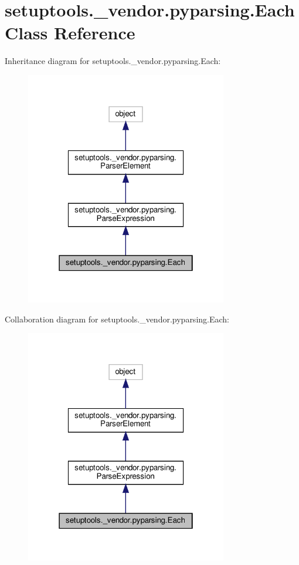 \hypertarget{classsetuptools_1_1__vendor_1_1pyparsing_1_1Each}{}\section{setuptools.\+\_\+vendor.\+pyparsing.\+Each Class Reference}
\label{classsetuptools_1_1__vendor_1_1pyparsing_1_1Each}


Inheritance diagram for setuptools.\+\_\+vendor.\+pyparsing.\+Each\+:
\nopagebreak
\begin{figure}[H]
\begin{center}
\leavevmode
\includegraphics[width=250pt]{classsetuptools_1_1__vendor_1_1pyparsing_1_1Each__inherit__graph}
\end{center}
\end{figure}


Collaboration diagram for setuptools.\+\_\+vendor.\+pyparsing.\+Each\+:
\nopagebreak
\begin{figure}[H]
\begin{center}
\leavevmode
\includegraphics[width=250pt]{classsetuptools_1_1__vendor_1_1pyparsing_1_1Each__coll__graph}
\end{center}
\end{figure}
